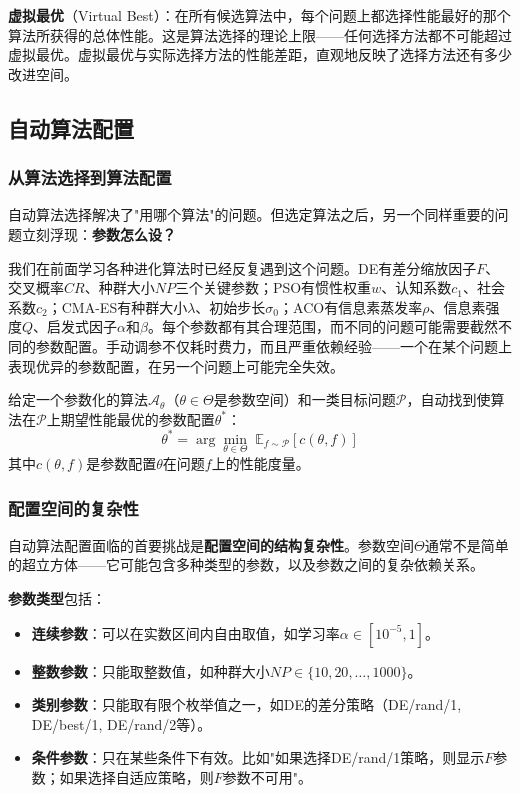 \documentclass[lang=cn,zihao=-4,a4paper,fontset=windows]{beautybook}
\begin{document}
\textbf{虚拟最优}（Virtual Best）：在所有候选算法中，每个问题上都选择性能最好的那个算法所获得的总体性能。这是算法选择的理论上限——任何选择方法都不可能超过虚拟最优。虚拟最优与实际选择方法的性能差距，直观地反映了选择方法还有多少改进空间。

\subsection{自动算法配置}

\subsubsection{从算法选择到算法配置}

自动算法选择解决了"用哪个算法"的问题。但选定算法之后，另一个同样重要的问题立刻浮现：\textbf{参数怎么设？}

我们在前面学习各种进化算法时已经反复遇到这个问题。DE有差分缩放因子$F$、交叉概率$CR$、种群大小$NP$三个关键参数；PSO有惯性权重$w$、认知系数$c_1$、社会系数$c_2$；CMA-ES有种群大小$\lambda$、初始步长$\sigma_0$；ACO有信息素蒸发率$\rho$、信息素强度$Q$、启发式因子$\alpha$和$\beta$。每个参数都有其合理范围，而不同的问题可能需要截然不同的参数配置。手动调参不仅耗时费力，而且严重依赖经验——一个在某个问题上表现优异的参数配置，在另一个问题上可能完全失效。

\begin{definition}
给定一个参数化的算法$\mathcal{A}_\theta$（$\theta \in \Theta$是参数空间）和一类目标问题$\mathcal{P}$，自动找到使算法在$\mathcal{P}$上期望性能最优的参数配置$\theta^*$：
\[
\theta^* = \arg\min_{\theta \in \Theta} \; \mathbb{E}_{f \sim \mathcal{P}} \left[ c(\theta, f) \right]
\]
其中$c(\theta, f)$是参数配置$\theta$在问题$f$上的性能度量。
\end{definition}

\subsubsection{配置空间的复杂性}

自动算法配置面临的首要挑战是\textbf{配置空间的结构复杂性}。参数空间$\Theta$通常不是简单的超立方体——它可能包含多种类型的参数，以及参数之间的复杂依赖关系。

\textbf{参数类型}包括：
\begin{itemize}
    \item \textbf{连续参数}：可以在实数区间内自由取值，如学习率$\alpha \in [10^{-5}, 1]$。
    \item \textbf{整数参数}：只能取整数值，如种群大小$NP \in \{10, 20, \dots, 1000\}$。
    \item \textbf{类别参数}：只能取有限个枚举值之一，如DE的差分策略（DE/rand/1, DE/best/1, DE/rand/2等）。
    \item \textbf{条件参数}：只在某些条件下有效。比如"如果选择DE/rand/1策略，则显示$F$参数；如果选择自适应策略，则$F$参数不可用"。
\end{itemize}
\end{document}
